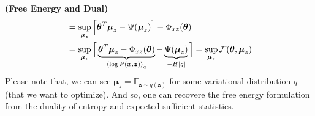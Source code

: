 \begin{remark}{\textbf{(Free Energy and Dual)}}
\begin{equation*}
\begin{aligned}
        &= \sup_{\boldsymbol \mu_z}\Big[ \boldsymbol\theta^T\boldsymbol \mu_z - \Psi(\boldsymbol \mu_z) \Big] - \Phi_{xz}(\boldsymbol \theta) \\
        &= \sup_{\boldsymbol \mu_z}\Big[ \underbrace{\boldsymbol\theta^T\boldsymbol \mu_z - \Phi_{xz}(\boldsymbol \theta)}_{\left\langle \log P(\boldsymbol x, \boldsymbol z) \right\rangle_q} - \underbrace{\Psi(\boldsymbol \mu_z)}_{-H[q]} \Big] = \sup_{\boldsymbol \mu_z}\mathcal{F}(\boldsymbol \theta, \boldsymbol \mu_z)
    \end{aligned}
    \end{equation*}
    Please note that, we can see $\boldsymbol \mu_z = \mathbb{E}_{\boldsymbol z \sim q(\boldsymbol z)}$ for some variational distribution $q$ (that we want to optimize). And so, one can recovere the free energy formulation from the duality of entropy and expected sufficient statistics.
\end{remark}

